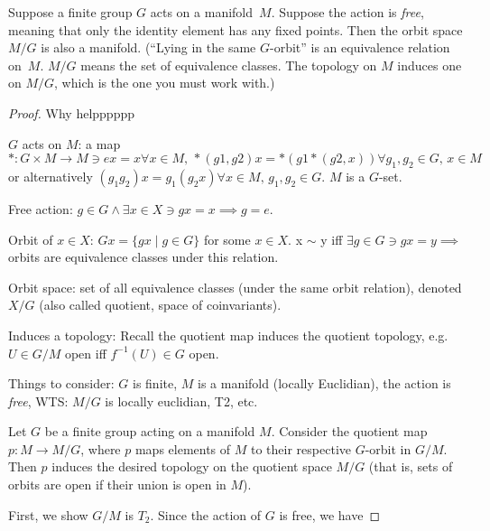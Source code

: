 \begin{problem}
        Suppose a finite group $G$ acts on a manifold~$M$.  Suppose
    the action is \textit{free}, meaning that only the identity
    element has any fixed points.  Then the orbit space $M/G$ is
    also a manifold.  (``Lying in the same $G$-orbit'' is an
    equivalence relation on~$M$.  $M/G$ means the set of equivalence
    classes.  The topology on $M$ induces one on $M/G$, which
    is the one you must work with.)
\end{problem}
\begin{proof}
    Why helpppppp

    $G$ acts on $M$: a map $*:G \times M \to M \ni ex=x \forall x \in M, \, *(g1,g2)x=*(g1*(g2,x)) \forall g_1,g_2 \in G, \, x \in M$ or alternatively $(g_1g_2)x=g_1(g_2x) \forall x \in M, \, g_1, g_2 \in G.$ $M$ is a $G$-set. 

    Free action: $g \in G \land \exists x \in X \ni gx=x \implies g=e.$

    Orbit of $x \in X$: $Gx = \{ gx \mid g \in G \}$ for some $x \in X$. x $\sim$ y iff $\exists g \in G \ni gx=y \implies$ orbits are equivalence classes under this relation. 

    Orbit space: set of all equivalence classes (under the same orbit relation), denoted $X/G$ (also called quotient, space of coinvariants).

    Induces a topology: Recall the quotient map induces the quotient topology, e.g. $U \in G/M$ open iff $f^{-1}(U) \in G$ open.

    Things to consider: $G$ is finite, $M$ is a manifold (locally Euclidian), the action is  \textit{free}, WTS: $M/G$ is locally euclidian, T2, etc.
    \vspace{5mm}

    Let $G$ be a finite group acting on a manifold $M$. Consider the quotient map $p:M \to M/G$, where $p$ maps elements of $M$ to their respective $G$-orbit in $G/M$. Then $p$ induces the desired topology on the quotient space $M/G$ (that is, sets of orbits are open if their union is open in $M$). 

    First, we show $G/M$ is $T_2$.
    Since the action of $G$ is free, we have
\end{proof}

